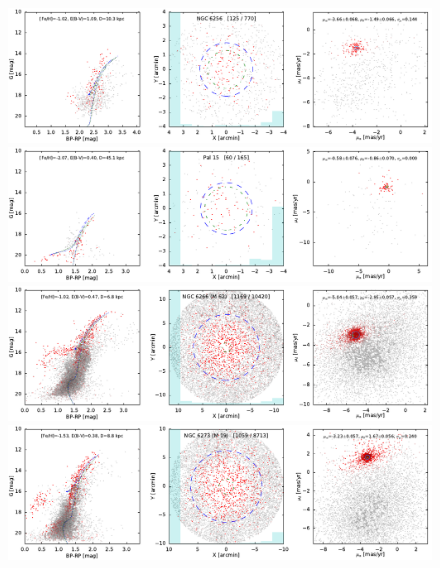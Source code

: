 \documentclass[usenatbib]{mnras}
\begin{document}
\clearpage\begin{figure}
\contcaption{}
\includegraphics{figs/NGC_6256.pdf}
\includegraphics{figs/Pal_15.pdf}
\includegraphics{figs/NGC_6266_M_62.pdf}
\includegraphics{figs/NGC_6273_M_19.pdf}
\end{figure}
\end{document}
